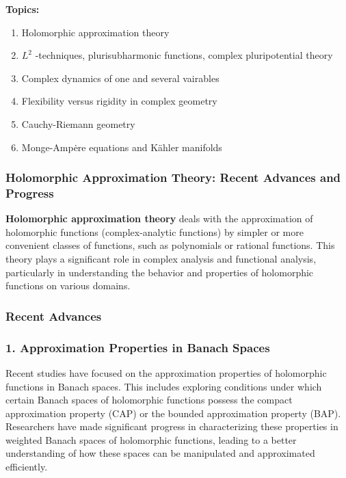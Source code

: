 \documentclass[lang=en,12pt]{beautybook}
\begin{document}
\begin{fancybox}
  \begin{flushleft}
  \Large\bfseries  Topics:
  \end{flushleft}
  \bfseries
\begin{enumerate}[font=\upshape\color{purple}\large\bfseries,label=\Roman*.]
  \item Holomorphic approximation theory
  
  \item $L^2$ -techniques, plurisubharmonic functions, complex pluripotential theory
  
  \item Complex dynamics of one and several vairables
  
  \item Flexibility versus rigidity in complex geometry
  
  \item Cauchy-Riemann geometry
  
  \item Monge-Ampėre equations and Kähler manifolds
\end{enumerate}
\end{fancybox}

\subsubsection*{Holomorphic Approximation Theory: Recent Advances and Progress}

\textbf{Holomorphic approximation theory} deals with the approximation of holomorphic functions (complex-analytic functions) by simpler or more convenient classes of functions, such as polynomials or rational functions. This theory plays a significant role in complex analysis and functional analysis, particularly in understanding the behavior and properties of holomorphic functions on various domains.

\subsubsection*{Recent Advances}

\subsubsection*{1. Approximation Properties in Banach Spaces}
Recent studies have focused on the approximation properties of holomorphic functions in Banach spaces. This includes exploring conditions under which certain Banach spaces of holomorphic functions possess the compact approximation property (CAP) or the bounded approximation property (BAP). Researchers have made significant progress in characterizing these properties in weighted Banach spaces of holomorphic functions, leading to a better understanding of how these spaces can be manipulated and approximated efficiently.
\end{document}
